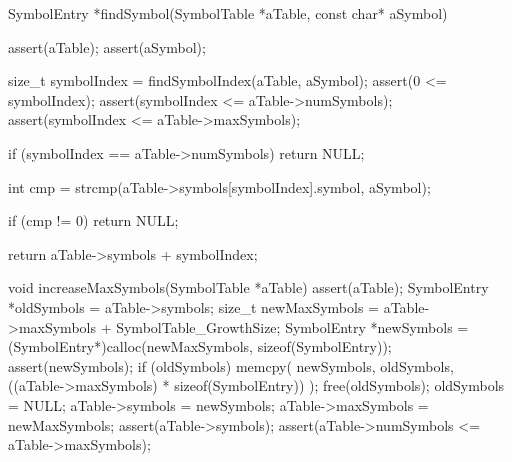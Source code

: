 SymbolEntry *findSymbol(SymbolTable *aTable, const char* aSymbol) {  
  assert(aTable);
  assert(aSymbol);
  
  size_t symbolIndex = findSymbolIndex(aTable, aSymbol);
  assert(0 <= symbolIndex);
  assert(symbolIndex <= aTable->numSymbols);
  assert(symbolIndex <= aTable->maxSymbols);
    
  if (symbolIndex == aTable->numSymbols) return NULL;
  
  int cmp = strcmp(aTable->symbols[symbolIndex].symbol, aSymbol);
  
  if (cmp != 0) return NULL;
  
  return aTable->symbols + symbolIndex;
}

void increaseMaxSymbols(SymbolTable *aTable) {
  assert(aTable);
  SymbolEntry *oldSymbols = aTable->symbols;
  size_t newMaxSymbols    = aTable->maxSymbols + SymbolTable_GrowthSize;
  SymbolEntry *newSymbols =
    (SymbolEntry*)calloc(newMaxSymbols, sizeof(SymbolEntry));
  assert(newSymbols);
  if (oldSymbols) {
    memcpy(
      newSymbols,
      oldSymbols,
      ((aTable->maxSymbols) * sizeof(SymbolEntry))
    );
    free(oldSymbols);
    oldSymbols = NULL;
  }
  aTable->symbols    = newSymbols;
  aTable->maxSymbols = newMaxSymbols;
  assert(aTable->symbols);
  assert(aTable->numSymbols <= aTable->maxSymbols);
}

